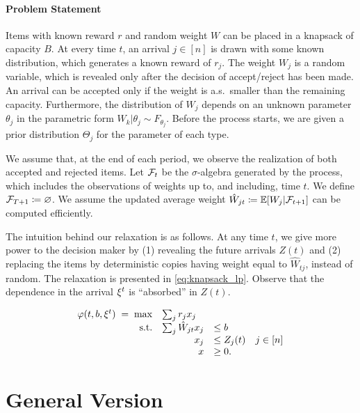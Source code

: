 \documentclass[letterpaper,11pt]{article}
\begin{document}
\paragraph{Problem Statement}
Items with known reward $r$ and random weight $W$ can be placed in a knapsack of capacity $B$.
At every time $t$, an arrival $j\in[n]$ is drawn with some known distribution, which generates a known reward of $r_j$.
The weight $W_j$ is a random variable, which is revealed only after the decision of accept/reject has been made.
An arrival can be accepted only if the weight is a.s.\ smaller than the remaining capacity.
Furthermore, the distribution of $W_j$ depends on an unknown parameter $\theta_j$ in the parametric form $W_k|\theta_j\sim F_{\theta_j}$.
Before the process starts, we are given a prior distribution $\Theta_j$ for the parameter of each type.

We assume that, at the end of each period, we observe the realization of both accepted and rejected items.
Let $\mathcal{F}_t$ be the $\sigma$-algebra generated by the process, which includes the observations of weights up to, and including, time $t$.
We define $\mathcal{F}_{T+1}\coloneqq\varnothing$.
We assume the updated average weight $\hat W_{jt} \coloneqq  \mathbb{E}[W_j|\mathcal{F}_{t+1}]$ can be computed efficiently.

The intuition behind our relaxation is as follows.
At any time $t$, we give more power to the decision maker by (1) revealing the future arrivals $Z(t)$ and (2) replacing the items by deterministic copies having weight equal to $\hat W_{tj}$, instead of random.
The relaxation is presented in \cref{eq:knapsack_lp}.
Observe that the dependence in the arrival $\xi^t$ is ``absorbed'' in $Z(t)$.

\begin{equation}\label{eq:knapsack_lp}
\begin{array}{rrll}
\varphi(t,b,\xit) \; = \; \max & \multicolumn{3}{l}{\sum_{j}r_{j}x_j} \\
\text{s.t.}& \sum_{j}\hat W_{jt}x_j  &\leq b  \\
&  x_j & \leq Z_j(t)  & j\in [n] \\
& x&\geq 0.
\end{array}
\end{equation}




\section{General Version}
\end{document}
